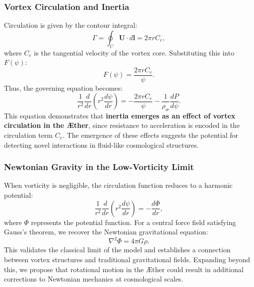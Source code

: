 \documentclass[a4paper,10pt]{article}
\begin{document}
\subsubsection*{Vortex Circulation and Inertia}
Circulation is given by the contour integral:
\begin{equation*}
    \Gamma = \oint_C \mathbf{U} \cdot d\mathbf{l} = 2 \pi r C_e,
\end{equation*}
where $C_e$ is the tangential velocity of the vortex core. Substituting this into $F(\psi)$:
\begin{equation*}
    F(\psi) = \frac{2 \pi r C_e}{\psi}.
\end{equation*}
Thus, the governing equation becomes:
\begin{equation*}
    \frac{1}{r^2} \frac{d}{dr} \left( r^2 \frac{d\psi}{dr} \right) = - \frac{2 \pi r C_e}{\psi} - \frac{1}{\rho_\text{\ae}} \frac{dP}{d\psi}.
\end{equation*}
This equation demonstrates that \textbf{inertia emerges as an effect of vortex circulation in the Æther}, since resistance to acceleration is encoded in the circulation term $C_e$. The emergence of these effects suggests the potential for detecting novel interactions in fluid-like cosmological structures.

\subsubsection*{Newtonian Gravity in the Low-Vorticity Limit}
When vorticity is negligible, the circulation function reduces to a harmonic potential:
\begin{equation*}
    \frac{1}{r^2} \frac{d}{dr} \left( r^2 \frac{d\psi}{dr} \right) = - \frac{d\Phi}{dr},
\end{equation*}
where $\Phi$ represents the potential function. For a central force field satisfying Gauss's theorem, we recover the Newtonian gravitational equation:
\begin{equation*}
    \nabla^2 \Phi = 4 \pi G \rho.
\end{equation*}
This validates the classical limit of the model and establishes a connection between vortex structures and traditional gravitational fields. Expanding beyond this, we propose that rotational motion in the Æther could result in additional corrections to Newtonian mechanics at cosmological scales.
\end{document}
